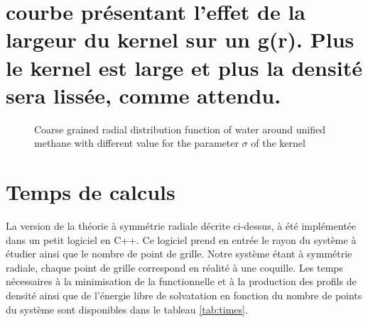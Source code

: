 \section{courbe présentant l'effet de la largeur du kernel sur un g(r). Plus le kernel est large et plus la densité sera lissée, comme attendu.} \label{app:curve}
\begin{figure}[!htbp]
    \center
    \caption{Coarse grained radial distribution function of water around unified methane with different value for the parameter $\sigma$ of the kernel}
    \label{fig:coarse_grained_effect}
\end{figure}







\section{Temps de calculs} \label{app:calculTime}
La version de la théorie à symmétrie radiale décrite ci-dessus, à été implémentée dans un petit logiciel en C++. Ce logiciel prend en entrée le rayon du système à étudier ainsi que le nombre de point de grille. Notre système étant à symmétrie radiale, chaque point de grille correspond en réalité à une coquille. Les temps nécessaires à la minimisation de la functionnelle et à la production des profils de densité ainsi que de l'énergie libre de solvatation en fonction du nombre de points du système sont disponibles dans le tableau \ref{tab:times}.


